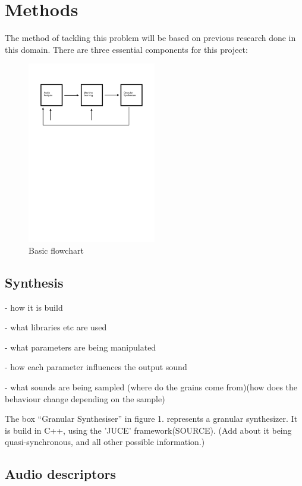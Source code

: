 \chapter{Methods}
\label{chapterlabel3}

The method of tackling this problem will be based on previous research done in this domain. There are three essential components for this project:
\begin{figure}[h]
\caption{Basic flowchart}
\centering
\includegraphics[width=0.5\textwidth]{images/flowchart}
\end{figure}

\section{Synthesis}

- how it is build

- what libraries etc are used

- what parameters are being manipulated

- how each parameter influences the output sound

- what sounds are being sampled (where do the grains come from)(how does the
behaviour change depending on the sample)

The box ``Granular Synthesiser'' in figure 1. represents a granular synthesizer.
It is build in C++, using the 'JUCE' framework(SOURCE). (Add about it being
quasi-synchronous, and all other possible information.)

\section{Audio descriptors}

